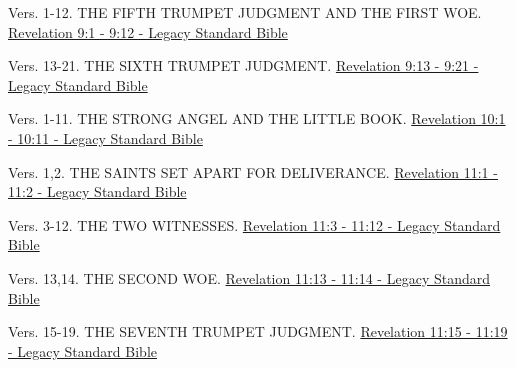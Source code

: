 \documentclass[
  ignorenonframetext,
]{beamer}
\begin{document}
\begin{frame}{9}
\label{section-262}
\begin{block}{Vers. 1-12. THE FIFTH TRUMPET JUDGMENT AND THE FIRST WOE.}
\label{vers.-1-12.-the-fifth-trumpet-judgment-and-the-first-woe.}
\href{https://read.lsbible.org/?q=rev9\%3A1-12}{Revelation 9:1 - 9:12 -
Legacy Standard Bible}
\end{block}

\begin{block}{Vers. 13-21. THE SIXTH TRUMPET JUDGMENT.}
\label{vers.-13-21.-the-sixth-trumpet-judgment.}
\href{https://read.lsbible.org/?q=rev9\%3A13-21}{Revelation 9:13 - 9:21
- Legacy Standard Bible}
\end{block}
\end{frame}

\begin{frame}{10}
\label{section-263}
\begin{block}{Vers. 1-11. THE STRONG ANGEL AND THE LITTLE BOOK.}
\label{vers.-1-11.-the-strong-angel-and-the-little-book.}
\href{https://read.lsbible.org/?q=rev10\%3A1-11}{Revelation 10:1 - 10:11
- Legacy Standard Bible}
\end{block}
\end{frame}

\begin{frame}{11}
\label{section-264}
\begin{block}{Vers. 1,2. THE SAINTS SET APART FOR DELIVERANCE.}
\label{vers.-12.-the-saints-set-apart-for-deliverance.}
\href{https://read.lsbible.org/?q=rev11\%3A1-2}{Revelation 11:1 - 11:2 -
Legacy Standard Bible}
\end{block}

\begin{block}{Vers. 3-12. THE TWO WITNESSES.}
\label{vers.-3-12.-the-two-witnesses.}
\href{https://read.lsbible.org/?q=rev11\%3A3-12}{Revelation 11:3 - 11:12
- Legacy Standard Bible}
\end{block}

\begin{block}{Vers. 13,14. THE SECOND WOE.}
\label{vers.-1314.-the-second-woe.}
\href{https://read.lsbible.org/?q=rev11\%3A13-14}{Revelation 11:13 -
11:14 - Legacy Standard Bible}
\end{block}

\begin{block}{Vers. 15-19. THE SEVENTH TRUMPET JUDGMENT.}
\label{vers.-15-19.-the-seventh-trumpet-judgment.}
\href{https://read.lsbible.org/?q=rev11\%3A15-19}{Revelation 11:15 -
11:19 - Legacy Standard Bible}
\end{block}
\end{frame}
\end{document}
